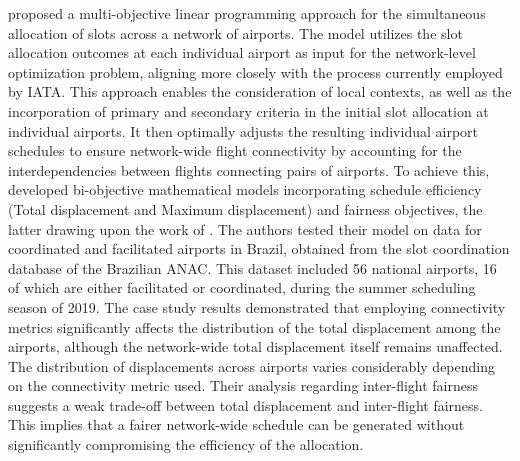  proposed a multi-objective linear programming approach for the simultaneous allocation of slots across a network of airports. The model utilizes the slot allocation outcomes at each individual airport as input for the network-level optimization problem, aligning more closely with the process currently employed by \acrshort{IATA}. This approach enables the consideration of local contexts, as well as the incorporation of primary and secondary criteria in the initial slot allocation at individual airports. It then optimally adjusts the resulting individual airport schedules to ensure network-wide flight connectivity by accounting for the interdependencies between flights connecting pairs of airports. To achieve this,  developed bi-objective mathematical models incorporating schedule efficiency (Total displacement and Maximum displacement) and fairness objectives, the latter drawing upon the work of . The authors tested their model on data for coordinated and facilitated airports in Brazil, obtained from the slot coordination database of the Brazilian \acrshort{ANAC}. This dataset included 56 national airports, 16 of which are either facilitated or coordinated, during the summer scheduling season of 2019. The case study results demonstrated that employing connectivity metrics significantly affects the distribution of the total displacement among the airports, although the network-wide total displacement itself remains unaffected. The distribution of displacements across airports varies considerably depending on the connectivity metric used. Their analysis regarding inter-flight fairness suggests a weak trade-off between total displacement and inter-flight fairness. This implies that a fairer network-wide schedule can be generated without significantly compromising the efficiency of the allocation.

